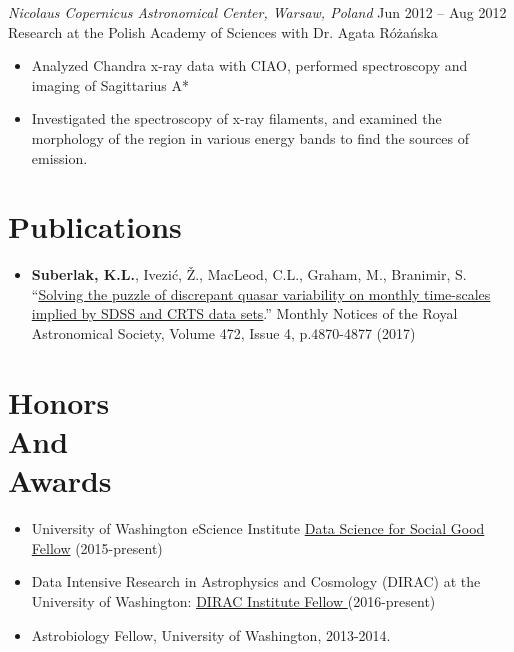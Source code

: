\documentclass[margin]{res}
\begin{document}
\begin{resume}
{\sl Nicolaus Copernicus Astronomical Center, Warsaw, Poland}  \hfill   Jun 2012 -- Aug 2012 \\
Research at the Polish Academy of Sciences with Dr. Agata R\'{o}\.{z}a\'{n}ska
\begin{itemize}
	\item Analyzed Chandra x-ray data with CIAO, performed  spectroscopy and imaging of Sagittarius A*
	\item Investigated the spectroscopy of x-ray filaments, and examined the morphology of the region in various energy bands to find the sources of emission.
\end{itemize}



\section{Publications}
\begin{itemize}   
\item \textbf{Suberlak, K.L.}, Ivezi\'c, \v{Z}., MacLeod, C.L., Graham, M., Branimir, S. ``\href{https://doi.org/10.1093/mnras/stx2310}{Solving the puzzle of discrepant quasar variability on monthly time-scales implied by SDSS and CRTS data sets}.'' Monthly Notices of the Royal Astronomical Society, Volume 472, Issue 4, p.4870-4877 (2017)

\end{itemize}



\section{Honors\\And\\Awards} 
\begin{itemize}  
\item University of Washington eScience Institute \href{https://escience.washington.edu/dssg/}{Data Science for Social Good Fellow} (2015-present)

\item Data Intensive Research in Astrophysics and Cosmology (DIRAC) at the University of Washington: \href{https://dirac.astro.washington.edu}{DIRAC Institute Fellow }(2016-present) 
 
\item Astrobiology Fellow, University of Washington, 2013-2014. \\
\end{itemize}
                 





\end{resume}
\end{document}
